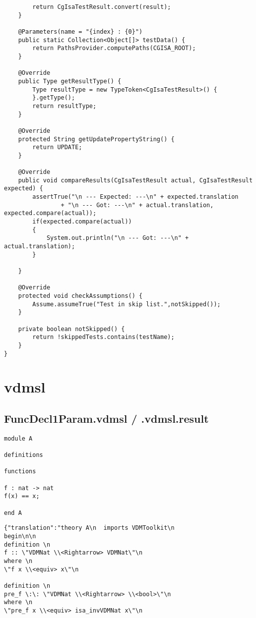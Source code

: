 \begin{appendices}
\begin{lstlisting}
        return CgIsaTestResult.convert(result);
    }

    @Parameters(name = "{index} : {0}")
    public static Collection<Object[]> testData() {
        return PathsProvider.computePaths(CGISA_ROOT);
    }

    @Override
    public Type getResultType() {
        Type resultType = new TypeToken<CgIsaTestResult>() {
        }.getType();
        return resultType;
    }

    @Override
    protected String getUpdatePropertyString() {
        return UPDATE;
    }

    @Override
    public void compareResults(CgIsaTestResult actual, CgIsaTestResult expected) {
        assertTrue("\n --- Expected: ---\n" + expected.translation
                + "\n --- Got: ---\n" + actual.translation, expected.compare(actual));
        if(expected.compare(actual))
        {
            System.out.println("\n --- Got: ---\n" + actual.translation);
        }

    }

    @Override
    protected void checkAssumptions() {
        Assume.assumeTrue("Test in skip list.",notSkipped());
    }

    private boolean notSkipped() {
        return !skippedTests.contains(testName);
    }
}

\end{lstlisting}

\section{vdmsl} \label{vdmsl}
\subsection{FuncDecl1Param.vdmsl / .vdmsl.result}
\begin{lstlisting}
module A

definitions

functions

f : nat -> nat
f(x) == x;

end A
\end{lstlisting}
\hfill\break
\begin{lstlisting}
{"translation":"theory A\n  imports VDMToolkit\n
begin\n\n
definition \n
f :: \"VDMNat \\<Rightarrow> VDMNat\"\n
where \n
\"f x \\<equiv> x\"\n

definition \n
pre_f \:\: \"VDMNat \\<Rightarrow> \\<bool>\"\n
where \n
\"pre_f x \\<equiv> isa_invVDMNat x\"\n


\end{lstlisting}
\end{appendices}
